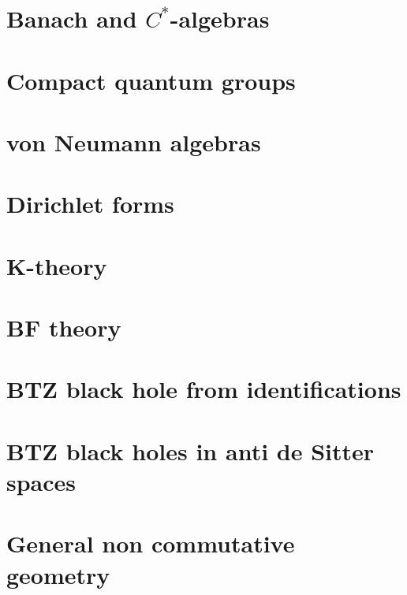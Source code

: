 \chapter{Banach and \texorpdfstring{$C^*$}{C*}-algebras}
   
   
   

\chapter{Compact quantum groups}


\chapter{von Neumann algebras}





\chapter{Dirichlet forms}


\chapter{K-theory}


\chapter{BF theory}


\chapter{BTZ black hole from identifications}




\chapter{BTZ black holes in anti de Sitter spaces}                  \label{ChapBHinAdS}
%
%










\chapter{General non commutative geometry}




